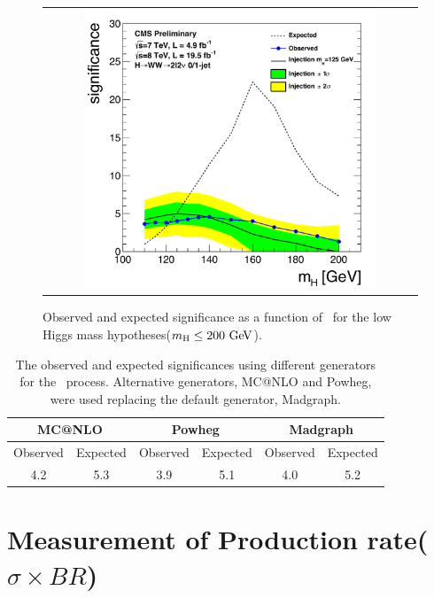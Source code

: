 %
\begin{figure}[htp] 
\centering 
\begin{tabular}{c} 
\includegraphics[width=0.8\textwidth]{figures/signif_allcomb_inj125_data_zoom.pdf} 
\end{tabular} 
\caption{Observed and expected significance as a function of \mHi\ for 
the low Higgs mass hypotheses($m_{\mathrm{H}}\le200~\mathrm{Ge\kern -0.1em V}$). }
\label{fig:significane_mH} 
\end{figure} 

%
\begin{table}[htp] 
\begin{center} 
\vspace{0.5cm} 
\caption{The observed and expected significances
using different generators for the \qqww\ process. Alternative generators,
MC@NLO and Powheg, were used replacing the default generator, Madgraph.}
\vspace{0.5cm} 
\begin{tabular}{cc|cc|cc} 
\hline 
\multicolumn{2}{c|}{MC@NLO}   &  \multicolumn{2}{c|}{Powheg} & \multicolumn{2}{c}{Madgraph} \\
\hline \hline 
Observed & Expected & Observed & Expected &  Observed & Expected \\ 
\hline 
4.2 & 5.3 & 3.9 & 5.1 & 4.0 & 5.2 \\
\hline 
\end{tabular} 
\label{tab:sig_diffgenerator} 
\end{center} 
\end{table} 


\section{Measurement of Production rate($\sigma \times BR$)}
\label{sec:mu}

